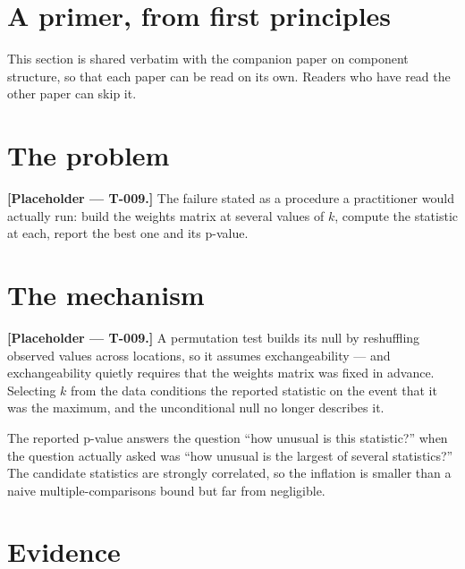 \documentclass[11pt,a4paper]{article}
\begin{document}
\section{A primer, from first principles\EXPOSITION}
\label{sec:primer}

This section is shared verbatim with the companion paper on component structure,
so that each paper can be read on its own. Readers who have read the other paper
can skip it.



\section{The problem\EXPOSITION}
\label{sec:problem}

\textbf{[Placeholder --- T-009.]} The failure stated as a procedure a
practitioner would actually run: build the weights matrix at several values of
$k$, compute the statistic at each, report the best one and its p-value.

\section{The mechanism\CONTRIBUTION}
\label{sec:mechanism}

\textbf{[Placeholder --- T-009.]} A permutation test builds its null by
reshuffling observed values across locations, so it assumes exchangeability ---
and exchangeability quietly requires that the weights matrix was fixed in
advance. Selecting $k$ from the data conditions the reported statistic on the
event that it was the maximum, and the unconditional null no longer describes it.

\begin{keyinsight}
The reported p-value answers the question ``how unusual is this statistic?'' when
the question actually asked was ``how unusual is the largest of several
statistics?'' The candidate statistics are strongly correlated, so the inflation
is smaller than a naive multiple-comparisons bound but far from negligible.
\end{keyinsight}

\section{Evidence\EVIDENCE}
\label{sec:evidence}
\end{document}
